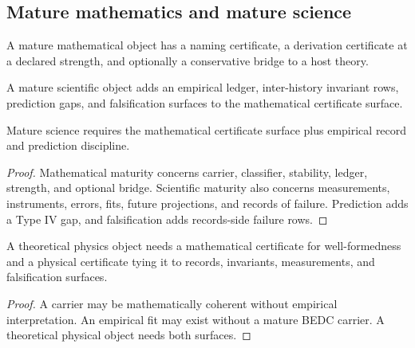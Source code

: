 \subsection{Mature mathematics and mature science}
\label{subsec:philosophy-mature-math-science}

\begin{definition}
\label{def:philosophy-mature-mathematical-object}
A mature mathematical object has a naming certificate, a derivation
certificate at a declared strength, and optionally a conservative
bridge to a host theory.
\end{definition}

\begin{definition}
\label{def:philosophy-mature-scientific-object}
A mature scientific object adds an empirical ledger, inter-history
invariant rows, prediction gaps, and falsification surfaces to the
mathematical certificate surface.
\end{definition}

\begin{theorem}
\label{thm:philosophy-science-adds-empirical-layer}
Mature science requires the mathematical certificate surface plus
empirical record and prediction discipline.
\end{theorem}
\begin{proof}
Mathematical maturity concerns carrier, classifier, stability, ledger,
strength, and optional bridge. Scientific maturity also concerns
measurements, instruments, errors, fits, future projections, and
records of failure. Prediction adds a Type IV gap, and falsification
adds records-side failure rows.
\end{proof}

\begin{corollary}
\label{cor:philosophy-theoretical-physics-two-certificate-faces}
A theoretical physics object needs a mathematical certificate for
well-formedness and a physical certificate tying it to records,
invariants, measurements, and falsification surfaces.
\end{corollary}
\begin{proof}
A carrier may be mathematically coherent without empirical
interpretation. An empirical fit may exist without a mature BEDC
carrier. A theoretical physical object needs both surfaces.
\end{proof}

